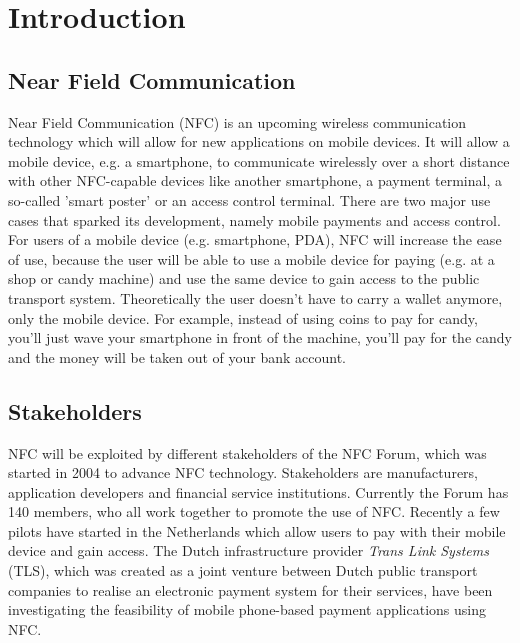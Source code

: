 \chapter{Introduction}


\section{Near Field Communication} %
Near Field Communication (NFC) is an upcoming wireless communication technology which will allow for new applications on mobile devices.
It will allow a mobile device, e.g. a smartphone, to communicate wirelessly over a short distance with other NFC-capable devices like another smartphone, a payment terminal, a so-called 'smart poster' or an access control terminal.
There are two major use cases that sparked its development, namely mobile payments and access control.
For users of a mobile device (e.g. smartphone, PDA), NFC will increase the ease of use, because the user will be able to use a mobile device for paying (e.g. at a shop or candy machine) and use the same device to gain access to the public transport system.
Theoretically the user doesn't have to carry a wallet anymore, only the mobile device.
For example, instead of using coins to pay for candy, you'll just wave your smartphone in front of the machine, you'll pay for the candy and the money will be taken out of your bank account. 


\section{Stakeholders}
NFC will be exploited by different stakeholders of the NFC Forum, which was started in 2004 to advance NFC technology.
Stakeholders are manufacturers, application developers and financial service institutions.
Currently the Forum has 140 members, who all work together to promote the use of NFC. 
Recently a few pilots have started in the Netherlands which allow users to pay with their mobile device and gain access.
The Dutch infrastructure provider \textit{Trans Link Systems} (TLS), which was created as a joint venture between Dutch public transport companies to realise an electronic payment system for their services, have been investigating the feasibility of mobile phone-based payment applications using NFC. %

